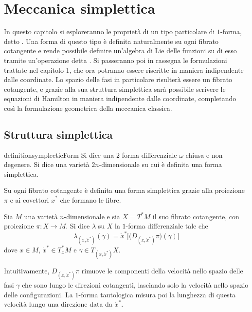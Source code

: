 \chapter{Meccanica simplettica}
In questo capitolo si esploreranno le proprietà di un tipo particolare di $1$-forma, detto . Una forma di questo tipo è definita naturalmente su ogni fibrato cotangente e rende possibile definire un'algebra di Lie delle funzioni su di esso tramite un'operazione detta . Si passeranno poi in rassegna le formulazioni trattate nel capitolo 1, che ora potranno essere riscritte in maniera indipendente dalle coordinate. Lo spazio delle fasi in particolare risulterà essere un fibrato cotangente, e grazie alla sua struttura simplettica sarà possibile scrivere le equazioni di Hamilton in maniera indipendente dalle coordinate, completando così la formulazione geometrica della meccanica classica.

\section{Struttura simplettica}

\begin{restatable}{definition}{symplecticForm}
  Si dice  una $2$-forma differenziale $\omega$ chiusa e non degenere. Si dice  una varietà $2n$-dimensionale su cui è definita una forma simplettica.
\end{restatable} %

Su ogni fibrato cotangente è definita una forma simplettica grazie alla proiezione $\pi$ e ai covettori $\dot{x}^*$ che formano le fibre.
\begin{definition}
  Sia $M$ una varietà $n$-dimensionale e sia $X = T^*M$ il suo fibrato cotangente, con proiezione $\pi:X\to M$. Si dice  $\lambda$ su $X$ la $1$-forma differenziale tale che \begin{equation*}
  \lambda_{(x, \dot{x}^*)}(\gamma) = \dot{x}^* \bigg[\big(D_{(x, \dot{x}^*)} \pi\big)(\gamma)\bigg]
  \end{equation*} 
  dove $x \in M$, $\dot{x}^* \in T_x^* M$ e $\gamma \in T_{(x,\dot{x}^*)}X$.
\end{definition}
\begin{remark}
  Intuitivamente, $D_{(x,\dot{x}^*)} \pi$ rimuove le componenti della velocità nello spazio delle fasi $\gamma$ che sono lungo le direzioni cotangenti, lasciando solo la velocità nello spazio delle configurazioni. La $1$-forma tautologica misura poi la lunghezza di questa velocità lungo una direzione data da $\dot{x}^*$. 
\end{remark}

